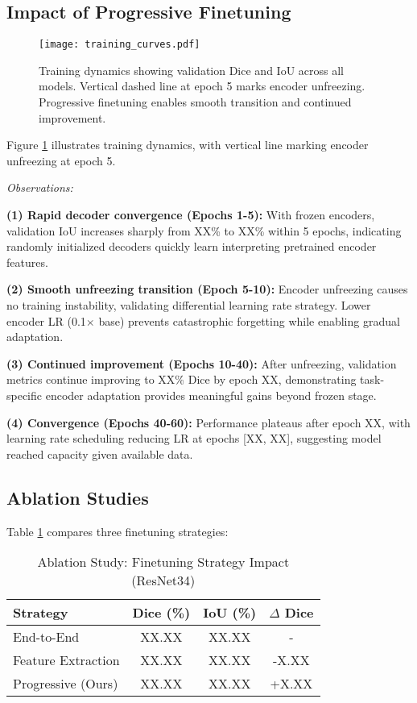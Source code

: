 \documentclass{article}
\begin{document}
\subsection{Impact of Progressive Finetuning}

\begin{figure}[t]
\centering
\texttt{[image: training\_curves.pdf]}
\caption{Training dynamics showing validation Dice and IoU across all models. Vertical dashed line at epoch 5 marks encoder unfreezing. Progressive finetuning enables smooth transition and continued improvement.}
\label{fig:training_curves}
\end{figure}

Figure \ref{fig:training_curves} illustrates training dynamics, with vertical line marking encoder unfreezing at epoch 5.

\textit{Observations:}

\textbf{(1) Rapid decoder convergence (Epochs 1-5):} With frozen encoders, validation IoU increases sharply from XX\% to XX\% within 5 epochs, indicating randomly initialized decoders quickly learn interpreting pretrained encoder features.

\textbf{(2) Smooth unfreezing transition (Epoch 5-10):} Encoder unfreezing causes no training instability, validating differential learning rate strategy. Lower encoder LR (0.1$\times$ base) prevents catastrophic forgetting while enabling gradual adaptation.

\textbf{(3) Continued improvement (Epochs 10-40):} After unfreezing, validation metrics continue improving to XX\% Dice by epoch XX, demonstrating task-specific encoder adaptation provides meaningful gains beyond frozen stage.

\textbf{(4) Convergence (Epochs 40-60):} Performance plateaus after epoch XX, with learning rate scheduling reducing LR at epochs [XX, XX], suggesting model reached capacity given available data.

\subsection{Ablation Studies}

Table \ref{tab:ablation} compares three finetuning strategies:

\begin{table}[t]
\centering
\caption{Ablation Study: Finetuning Strategy Impact (ResNet34)}
\label{tab:ablation}
\begin{tabular}{@{}lccc@{}}
\toprule
\textbf{Strategy} & \textbf{Dice (\%)} & \textbf{IoU (\%)} & \textbf{$\Delta$ Dice} \\
\midrule
End-to-End & XX.XX & XX.XX & - \\
Feature Extraction & XX.XX & XX.XX & -X.XX \\
Progressive (Ours) & XX.XX & XX.XX & +X.XX \\
\bottomrule
\end{tabular}
\end{table}
\end{document}
